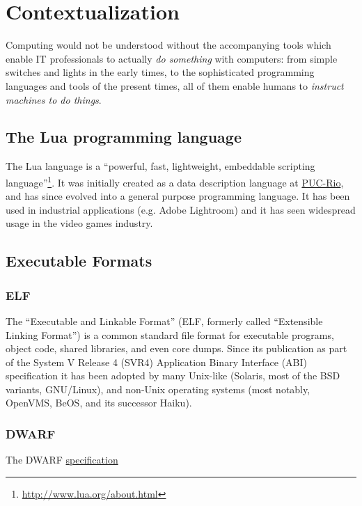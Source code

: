 
\chapter{Contextualization}

Computing would not be understood without the accompanying tools which enable
IT professionals to actually \emph{do something} with computers: from simple
switches and lights in the early times, to the sophisticated programming
languages and tools of the present times, all of them enable humans to
\emph{instruct machines to do things}.



\section{The Lua programming language}

The Lua language is a “powerful, fast, lightweight, embeddable scripting
language”\footnote{\url{http://www.lua.org/about.html}}. It was initially
created as a data description language at
\href{http://www.puc-rio.br/}{PUC-Rio}, and has since evolved into a general
purpose programming language. It has been used in industrial applications
(e.g. Adobe Lightroom) and it has seen widespread usage in the video games
industry.

\section{Executable Formats}

\subsection{ELF}

The “Executable and Linkable Format” (ELF, formerly called “Extensible Linking
Format”) is a common standard file format for executable programs, object
code, shared libraries, and even core dumps. Since its publication as part of
the System V Release 4 (SVR4) Application Binary Interface (ABI) specification
it has been adopted by many Unix-like (Solaris, most of the BSD variants,
GNU/Linux), and non-Unix operating systems (most notably, OpenVMS, BeOS, and
its successor Haiku).


\subsection{DWARF}

The DWARF \href{http://dwarfstd.org}{specification}


